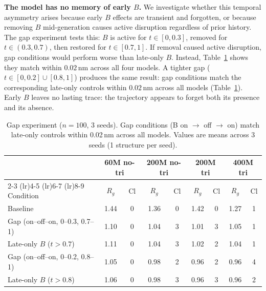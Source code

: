 \documentclass{article}
\begin{document}
\textbf{The model has no memory of early $B$.}
We investigate whether this temporal asymmetry arises because early $B$ effects are transient and forgotten, or because removing $B$ mid-generation causes active disruption regardless of prior history.
The gap experiment tests this: $B$ is active for $t \in [0, 0.3]$, removed for $t \in (0.3, 0.7)$, then restored for $t \in [0.7, 1]$.
If removal caused active disruption, gap conditions would perform worse than late-only $B$. Instead, Table~\ref{tab:gap} shows they match within $0.02$\,nm across all four models.
A tighter gap ($t \in [0, 0.2] \cup [0.8, 1]$) produces the same result: gap conditions match the corresponding late-only controls within $0.02$\,nm across all models (Table~\ref{tab:gap}).
Early $B$ leaves no lasting trace: the trajectory appears to forget both its presence and its absence.

\begin{table}[h]
    \centering
    \caption{Gap experiment ($n{=}100$, 3 seeds). Gap conditions (B on $\to$ off $\to$ on) match late-only controls within 0.02\,nm across all models. Values are means across 3 seeds (1 structure per seed).}
    \label{tab:gap}
    \begin{tabular}{lcccccccc}
        \toprule
        & \multicolumn{2}{c}{\textbf{60M no-tri}} & \multicolumn{2}{c}{\textbf{200M no-tri}} & \multicolumn{2}{c}{\textbf{200M tri}} & \multicolumn{2}{c}{\textbf{400M tri}} \\
        \cmidrule(lr){2-3} \cmidrule(lr){4-5} \cmidrule(lr){6-7} \cmidrule(lr){8-9}
        Condition & $R_g$ & Cl & $R_g$ & Cl & $R_g$ & Cl & $R_g$ & Cl \\
        \midrule
        Baseline & 1.44 & 0 & 1.36 & 0 & 1.42 & 0 & 1.27 & 1 \\
        Gap (on--off--on, 0--0.3, 0.7--1) & 1.10 & 0 & 1.04 & 3 & 1.01 & 3 & 1.05 & 1 \\
        Late-only $B$ ($t{>}0.7$) & 1.11 & 0 & 1.04 & 3 & 1.02 & 2 & 1.04 & 1 \\
        Gap (on--off--on, 0--0.2, 0.8--1) & 1.05 & 0 & 0.98 & 2 & 0.96 & 2 & 0.96 & 4 \\
        Late-only $B$ ($t{>}0.8$) & 1.06 & 0 & 0.98 & 3 & 0.96 & 3 & 0.96 & 2 \\
        \bottomrule
    \end{tabular}
\end{table}
\end{document}
